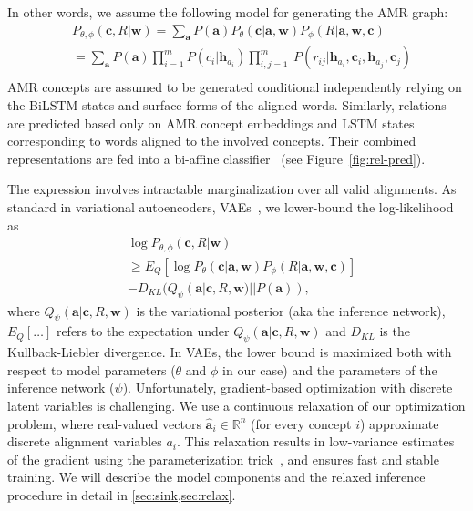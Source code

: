 \documentclass[11pt,a4paper]{article}
\begin{document}
In other words, we assume the following model for generating the AMR graph: 
\begin{align}
\nonumber
&P_{\theta,\phi}(\mathbf{c}, R | \mathbf{w})  \!
= \! \sum_{\!\mathbf{a}}{\! P(\mathbf{a}) P_\theta(\mathbf{c} | \mathbf{a}, \mathbf{w}) P_\phi(R | \mathbf{a}, \mathbf{w}, \mathbf{c})} \\
\nonumber
&=\! \sum_{ \mathbf{a}} {\! P(\mathbf{a}) \prod_{i=1}^{m}\! P(c_i | {\mathbf{h}_{a_i}})}
\!\!  \prod_{i,j=1}^{m}{\!\ P(r_{ij} | \mathbf{h}_{a_i},\! \mathbf{c}_i,\! \mathbf{h}_{a_j},\!\mathbf{c}_j)}\\
\nonumber
\end{align}
AMR concepts are assumed to be generated conditional independently relying on the BiLSTM states and surface forms of the aligned words. Similarly, relations are predicted based only on AMR concept embeddings and LSTM states corresponding to words aligned to the involved concepts. Their combined representations are fed into a bi-affine classifier~\cite{Biaffine} (see Figure~\ref{fig:rel-pred}). 



The expression involves intractable marginalization over all valid alignments. 
As standard in variational autoencoders, VAEs~\cite{kingma2013auto}, we lower-bound the log-likelihood as 
\begin{align}
\nonumber
&
\log P_{\theta,\phi}(\mathbf{c}, R | \mathbf{w}) 
\\
\nonumber
&
 \geq 
   E_Q [
   \log  P_\theta(\mathbf{c} | \mathbf{a}, \mathbf{w}) P_\phi(R | \mathbf{a}, \mathbf{w}, \mathbf{c}) 
   ] \\
   &
   \label{eq:elbo}
   - D_{KL}( Q_\psi(\mathbf{a} | \mathbf{c}, R, \mathbf{w}) || P(\mathbf{a})),
\end{align}
where $Q_\psi(\mathbf{a} | \mathbf{c}, R, \mathbf{w})$ is the variational posterior (aka the inference network), $E_Q [\ldots]$ refers to the expectation under $Q_\psi(\mathbf{a} | \mathbf{c}, R, \mathbf{w})$ and $D_{KL}$ is the Kullback-Liebler divergence. In VAEs, the lower bound is maximized both with respect to model parameters ($\theta$ and $\phi$ in our case) and the parameters of the inference network ($\psi$). 
Unfortunately, gradient-based optimization with discrete latent variables is challenging. We use a continuous relaxation of our optimization problem, where real-valued vectors $\hat{\mathbf{a}}_i \in \mathbb{R}^n$ (for every concept $i$) approximate discrete alignment variables $a_i$. This relaxation results in low-variance estimates of the gradient using the parameterization trick~\cite{kingma2013auto}, and ensures fast and stable training.
We will describe the model components and the relaxed inference procedure in detail in  \cref{sec:sink,sec:relax}.
\end{document}
